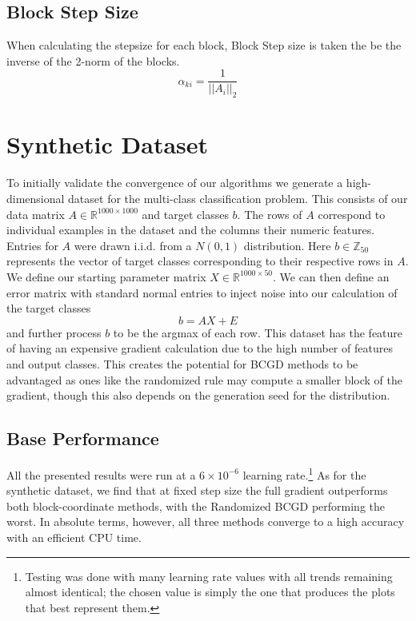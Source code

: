 \documentclass{article}
\begin{document}
\subsection{Block Step Size}
When calculating the stepsize for each block, Block Step size is taken the be the inverse of the 2-norm of the blocks.
$$\alpha_{ki} = \frac{1}{||A_i||_2}$$
\begin{comment}
\subsection{Exact Step Size}
We additionally test a psudo-exact stepsize. Typically calculated by $\frac{1}{L}$, we create an approximation using the inverse of the diagonal elements of $A^TA$.
\end{comment}

\section{Synthetic Dataset}
To initially validate the convergence of our algorithms we generate a high-dimensional dataset for the multi-class classification problem. This consists of our data matrix $A \in \mathbb{R}^{1000 \times 1000}$ and target classes $b$. The rows of $A$ correspond to individual examples in the dataset and the columns their numeric features. Entries for $A$ were drawn i.i.d. from a $N(0,1)$ distribution. Here $b \in \mathbb{Z}_{50}$ represents the vector of target classes corresponding to their respective rows in $A$. We define our starting parameter matrix $X \in \mathbb{R}^{1000 \times 50}$. We can then define an error matrix with standard normal entries to inject noise into our calculation of the target classes
$$b = AX + E$$
and further process $b$ to be the argmax of each row. This dataset has the feature of having an expensive gradient calculation due to the high number of features and output classes. This creates the potential for BCGD methods to be advantaged as ones like the randomized rule may compute a smaller block of the gradient, though this also depends on the generation seed for the distribution.

\subsection{Base Performance}
All the presented results were run at a $6 \times 10^{-6}$ learning rate.\footnote{Testing was done with many learning rate values with all trends remaining almost identical; the chosen value is simply the one that produces the plots that best represent them.}
As for the synthetic dataset, we find that at fixed step size the full gradient outperforms both block-coordinate methods, with the Randomized BCGD performing the worst. In absolute terms, however, all three methods converge to a high accuracy with an efficient CPU time.
\end{document}
